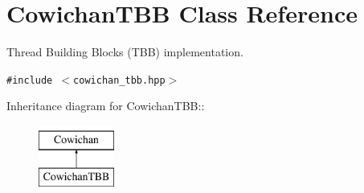 \hypertarget{class_cowichan_t_b_b}{
\section{CowichanTBB Class Reference}
\label{class_cowichan_t_b_b}
}
Thread Building Blocks (TBB) implementation.  


{\tt \#include $<$cowichan\_\-tbb.hpp$>$}

Inheritance diagram for CowichanTBB::\begin{figure}[H]
\begin{center}
\leavevmode
\includegraphics[height=2cm]{class_cowichan_t_b_b}
\end{center}
\end{figure}
